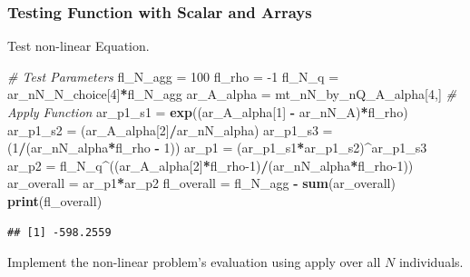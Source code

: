 \documentclass[
]{book}
\newenvironment{Shaded}{\begin{snugshade}}{\end{snugshade}}
\newcommand{\CommentTok}[1]{\textcolor[rgb]{0.56,0.35,0.01}{\textit{#1}}}
\newcommand{\DecValTok}[1]{\textcolor[rgb]{0.00,0.00,0.81}{#1}}
\newcommand{\KeywordTok}[1]{\textcolor[rgb]{0.13,0.29,0.53}{\textbf{#1}}}
\newcommand{\NormalTok}[1]{#1}
\newcommand{\OperatorTok}[1]{\textcolor[rgb]{0.81,0.36,0.00}{\textbf{#1}}}
\newcommand{\StringTok}[1]{\textcolor[rgb]{0.31,0.60,0.02}{#1}}
\begin{document}
\hypertarget{testing-function-with-scalar-and-arrays}{%
\subsubsection{Testing Function with Scalar and Arrays}\label{testing-function-with-scalar-and-arrays}}

Test non-linear Equation.

\begin{Shaded}
\begin{Highlighting}[]
\CommentTok{\# Test Parameters}
\NormalTok{fl\_N\_agg =}\StringTok{ }\DecValTok{100}
\NormalTok{fl\_rho =}\StringTok{ }\DecValTok{{-}1}
\NormalTok{fl\_N\_q =}\StringTok{ }\NormalTok{ar\_nN\_N\_choice[}\DecValTok{4}\NormalTok{]}\OperatorTok{*}\NormalTok{fl\_N\_agg}
\NormalTok{ar\_A\_alpha =}\StringTok{ }\NormalTok{mt\_nN\_by\_nQ\_A\_alpha[}\DecValTok{4}\NormalTok{,]}
\CommentTok{\# Apply Function}
\NormalTok{ar\_p1\_s1 =}\StringTok{ }\KeywordTok{exp}\NormalTok{((ar\_A\_alpha[}\DecValTok{1}\NormalTok{] }\OperatorTok{{-}}\StringTok{ }\NormalTok{ar\_nN\_A)}\OperatorTok{*}\NormalTok{fl\_rho)}
\NormalTok{ar\_p1\_s2 =}\StringTok{ }\NormalTok{(ar\_A\_alpha[}\DecValTok{2}\NormalTok{]}\OperatorTok{/}\NormalTok{ar\_nN\_alpha)}
\NormalTok{ar\_p1\_s3 =}\StringTok{ }\NormalTok{(}\DecValTok{1}\OperatorTok{/}\NormalTok{(ar\_nN\_alpha}\OperatorTok{*}\NormalTok{fl\_rho }\OperatorTok{{-}}\StringTok{ }\DecValTok{1}\NormalTok{))}
\NormalTok{ar\_p1 =}\StringTok{ }\NormalTok{(ar\_p1\_s1}\OperatorTok{*}\NormalTok{ar\_p1\_s2)}\OperatorTok{\^{}}\NormalTok{ar\_p1\_s3}
\NormalTok{ar\_p2 =}\StringTok{ }\NormalTok{fl\_N\_q}\OperatorTok{\^{}}\NormalTok{((ar\_A\_alpha[}\DecValTok{2}\NormalTok{]}\OperatorTok{*}\NormalTok{fl\_rho}\DecValTok{{-}1}\NormalTok{)}\OperatorTok{/}\NormalTok{(ar\_nN\_alpha}\OperatorTok{*}\NormalTok{fl\_rho}\DecValTok{{-}1}\NormalTok{))}
\NormalTok{ar\_overall =}\StringTok{ }\NormalTok{ar\_p1}\OperatorTok{*}\NormalTok{ar\_p2}
\NormalTok{fl\_overall =}\StringTok{ }\NormalTok{fl\_N\_agg }\OperatorTok{{-}}\StringTok{ }\KeywordTok{sum}\NormalTok{(ar\_overall)}
\KeywordTok{print}\NormalTok{(fl\_overall)}
\end{Highlighting}
\end{Shaded}

\begin{verbatim}
## [1] -598.2559
\end{verbatim}

Implement the non-linear problem's evaluation using apply over all \(N\) individuals.
\end{document}
